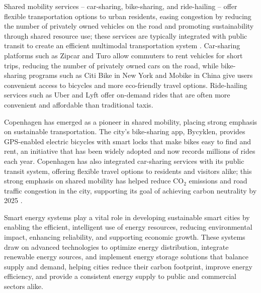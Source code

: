 \documentclass[journal]{IEEEtran}
\begin{document}
Shared mobility services -- car-sharing, bike-sharing, and ride-hailing -- offer flexible transportation options to urban residents, easing congestion by reducing the number of privately owned vehicles on the road and promoting sustainability through shared resource use; these services are typically integrated with public transit to create an efficient multimodal transportation system \cite{r11}. Car-sharing platforms such as Zipcar and Turo allow commuters to rent vehicles for short trips, reducing the number of privately owned cars on the road, while bike-sharing programs such as Citi Bike in New York and Mobike in China give users convenient access to bicycles and more eco-friendly travel options. Ride-hailing services such as Uber and Lyft offer on-demand rides that are often more convenient and affordable than traditional taxis.

Copenhagen has emerged as a pioneer in shared mobility, placing strong emphasis on sustainable transportation. The city's bike-sharing app, Bycyklen, provides GPS-enabled electric bicycles with smart locks that make bikes easy to find and rent, an initiative that has been widely adopted and now records millions of rides each year. Copenhagen has also integrated car-sharing services with its public transit system, offering flexible travel options to residents and visitors alike; this strong emphasis on shared mobility has helped reduce CO$_2$ emissions and road traffic congestion in the city, supporting its goal of achieving carbon neutrality by 2025 \cite{r78,r105}.

Smart energy systems play a vital role in developing sustainable smart cities by enabling the efficient, intelligent use of energy resources, reducing environmental impact, enhancing reliability, and supporting economic growth. These systems draw on advanced technologies to optimize energy distribution, integrate renewable energy sources, and implement energy storage solutions that balance supply and demand, helping cities reduce their carbon footprint, improve energy efficiency, and provide a consistent energy supply to public and commercial sectors alike.
\end{document}
